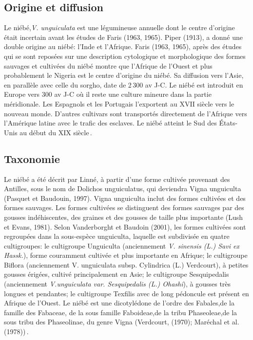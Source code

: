 \documentclass[a4paper,11pt]{article}
\begin{document}
\newpage



\subsection{Origine et diffusion}

Le niébé,\emph{V. unguiculata} est une légumineuse annuelle dont le centre
d’origine était incertain avant les études de Faris (1963,
1965). Piper (1913), a donné une double origine au niébé: l’Inde et
l’Afrique. Faris (1963, 1965), après des études qui se sont reposées
sur une description cytologique et morphologique des formes sauvages
et cultivées du niébé montre que l’Afrique de l’Ouest et plus
probablement le Nigeria est le centre d’origine du niébé. Sa diffusion
vers l’Asie, en parallèle avec celle du sorgho, date de 2\,300 av
J-C. Le niébé est introduit en Europe vers 300 av J-C où il reste une
culture mineure dans la partie méridionale. Les Espagnols et les
Portugais l’exportent au XVII\ieme{} siècle vers le nouveau monde. D’autres
cultivars sont transportés directement de l’Afrique vers l’Amérique
latine avec le trafic des esclaves. Le niébé atteint le Sud des
États-Unis au début du XIX\ieme{} siècle\,\cite{Sawadogo_2009}.

\subsection{Taxonomie}

Le niébé a été décrit par Linné, à partir d’une forme cultivée
provenant des Antilles, sous le nom de Dolichos unguiculatus, qui
deviendra Vigna unguiculta (Pasquet et Baudouin, 1997). Vigna
unguiculta inclut des formes cultivées et des formes sauvages. Les
formes cultivées se distinguent des formes sauvages par des gousses
indéhiscentes, des graines et des gousses de taille plus importante
(Lush et Evans, 1981). Selon Vanderborght et Baudoin (2001), les
formes cultivées sont regroupées dans la sous-espèce unguiculta,
laquelle est subdivisée en quatre cultigroupes: le cultigroupe
Unguiculta (anciennement \emph{ V. sinensis (L.) Savi ex Hassk.}), forme
couramment cultivée et plus importante en Afrique; le cultigroupe
Biflora (anciennement V. unguiculata subsp. Cylindrica (L.) Verdcourt),
à petites gousses érigées, cultivé principalement en Asie; le
cultigroupe Sesquipedalis (anciennement \emph{V.unguiculata
var. Sesquipedalis (L.) Ohashi}), à gousses très longues et pendantes;
le cultigroupe Texfilis avec de long pédoncule est présent en Afrique de l’Ouest. Le
niébé est une dicotylédone de l’ordre des Fabales,de la famille des Fabaceae,
de la sous famille Faboideae,de la tribu Phaseoleae,de la sous tribu des Phaseolinae,
du genre Vigna (Verdcourt, (1970); Maréchal et al. (1978))\,\cite{Sawadogo_2009}.
\end{document}
